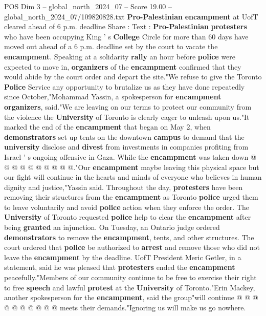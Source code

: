 \begin{textsample}{POS Dim 3 – global\_north\_2024\_07 – Score 19.00 – global\_north\_2024\_07/109820828.txt}  \label{ex:f3_pos_087}
\textbf{Pro-Palestinian} \textbf{encampment} at UofT cleared ahead of 6 p.m. deadline Share : Text : \textbf{Pro-Palestinian} \textbf{protesters} who have been occupying King ' s \textbf{College} Circle for more than 60 days have moved out ahead of a 6 p.m. deadline set by the court to vacate the \textbf{encampment}.
Speaking at a solidarity \textbf{rally} an hour before \textbf{police} were expected to move in, \textbf{organizers} of the \textbf{encampment} confirmed that they would abide by the court order and depart the site."We refuse to give the Toronto \textbf{Police} Service any opportunity to brutalize us as they have done repeatedly since October,"Mohammad Yassin, a spokesperson for \textbf{encampment} \textbf{organizers}, said."We are leaving on our terms to protect our community from the violence the \textbf{University} of Toronto is clearly eager to unleash upon us."It marked the end of the \textbf{encampment} that began on May 2, when \textbf{demonstrators} set up tents on the downtown \textbf{campus} to demand that the \textbf{university} disclose and \textbf{divest} from investments in companies profiting from Israel ' s ongoing offensive in Gaza.
While the \textbf{encampment} was taken down @ @ @ @ @ @ @ @ @ @."Our \textbf{encampment} maybe leaving this physical space but our fight will continue in the hearts and minds of everyone who believes in human dignity and justice,"Yassin said.
Throughout the day, \textbf{protesters} have been removing their structures from the \textbf{encampment} as Toronto \textbf{police} urged them to leave voluntarily and avoid \textbf{police} action when they enforce the order.
The \textbf{University} of Toronto requested \textbf{police} help to clear the \textbf{encampment} after being \textbf{granted} an injunction.
On Tuesday, an Ontario judge ordered \textbf{demonstrators} to remove the \textbf{encampment}, tents, and other structures.
The court ordered that \textbf{police} be authorized to \textbf{arrest} and remove those who did not leave the \textbf{encampment} by the deadline.
UofT President Meric Getler, in a statement, said he was pleased that \textbf{protesters} ended the \textbf{encampment} peacefully."Members of our community continue to be free to exercise their right to free \textbf{speech} and lawful \textbf{protest} at the \textbf{University} of Toronto."Erin Mackey, another spokesperson for the \textbf{encampment}, said the group"will continue @ @ @ @ @ @ @ @ @ @ meets their demands."Ignoring us will make us go nowhere.

\end{textsample}
